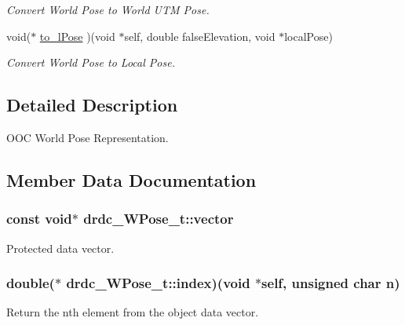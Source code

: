 \begin{CompactItemize}
\begin{CompactList}\small\item\em Convert World Pose to World UTM Pose. \item\end{CompactList}\item 
void($\ast$ \hyperlink{structdrdc__WPose__t_a4c73a193364ec71974ea44e10bde8a6}{to\_\-lPose} )(void $\ast$self, double falseElevation, void $\ast$localPose)
\begin{CompactList}\small\item\em Convert World Pose to Local Pose. \item\end{CompactList}\end{CompactItemize}


\subsection{Detailed Description}
OOC World Pose Representation. 



\subsection{Member Data Documentation}
\hypertarget{structdrdc__WPose__t_ee8bf5ed85771fb17a81ad4aa337655c}{
\subsubsection[vector]{\setlength{\rightskip}{0pt plus 5cm}const void$\ast$ {\bf drdc\_\-WPose\_\-t::vector}}}
\label{structdrdc__WPose__t_ee8bf5ed85771fb17a81ad4aa337655c}


Protected data vector. 

\hypertarget{structdrdc__WPose__t_da90532e6b28a4e0858b920649b6bc60}{
\subsubsection[index]{\setlength{\rightskip}{0pt plus 5cm}double($\ast$ {\bf drdc\_\-WPose\_\-t::index})(void $\ast$self, unsigned char n)}}
\label{structdrdc__WPose__t_da90532e6b28a4e0858b920649b6bc60}


Return the nth element from the object data vector. 

